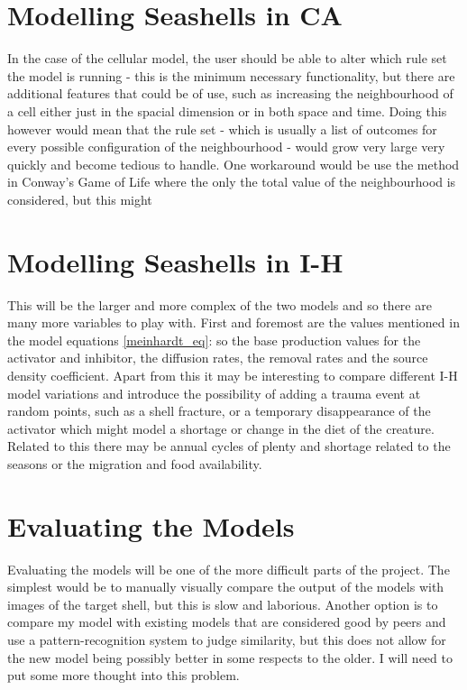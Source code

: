\documentclass[a4paper,11pt]{report}
\begin{document}
\section{Modelling Seashells in CA}
In the case of the cellular model, the user should be able to alter which rule set the model is running - this is the minimum necessary functionality, but there are additional features that could be of use, such as increasing the neighbourhood of a cell either just in the spacial dimension or in both space and time. Doing this however would mean that the rule set - which is usually a list of outcomes for every possible configuration of the neighbourhood - would grow very large very quickly and become tedious to handle. One workaround would be use the method in Conway's Game of Life \cite{gameoflife} where the only the total value of the neighbourhood is considered, but this might 


\section{Modelling Seashells in I-H}
This will be the larger and more complex of the two models and so there are many more variables to play with. First and foremost are the values mentioned in the model equations \ref{meinhardt_eq}: so the base production values for the activator and inhibitor, the diffusion rates, the removal rates and the source density coefficient. Apart from this it may be interesting to compare different I-H model variations \cite[47-48]{turingmorph} and introduce the possibility of adding a trauma event  at random points, such as a shell fracture, or a temporary disappearance of the activator which might model a shortage or change in the diet of the creature. Related to this there may be annual cycles of plenty and shortage related to the seasons or the migration and food availability.

\section{Evaluating the Models}
Evaluating the models will be one of the more difficult parts of the project. The simplest would be to manually visually compare the output of the models with images of the target shell, but this is slow and laborious. Another option is to compare my model with existing models that are considered good by peers and use a pattern-recognition system to judge similarity, but this does not allow for the new model being possibly better in some respects to the older. I will need to put some more thought into this problem.
\end{document}
